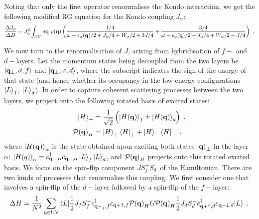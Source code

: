 \documentclass[%
reprint,
superscriptaddress,
groupedaddress,
superscriptaddress,
onecolumn,
10pt
]{revtex4-2}
\begin{document}
Noting that only the first operator renormalises the Kondo interaction, we get the following modified RG equation for the Kondo coupling \(J_\alpha\):
\begin{equation}\begin{aligned}
	\frac{\Delta J_\alpha}{\Delta D} = J_\alpha^2 \int_{UV} d{\bf q} ~\rho({\bf q}) \left(\frac{1/4}{\omega - \epsilon_\alpha({\bf q}) / 2 + J_\alpha / 4 + W_\alpha / 2 + 3J/4} + \frac{3/4}{\omega - \epsilon_\alpha({\bf q}) / 2 + J_\alpha / 4 + W_\alpha / 2 - J/4}\right)~,
\end{aligned}\end{equation}




We now turn to the renormalisation of \(J\), arising from hybridisation of \(f-\) and \(d-\)layers. Let the momentum states being decoupled from the two layers be \(\ket{{\bf q}_\pm,\sigma,f}\) and \(\ket{{\bf q}_\pm,\sigma,d}\), where the subscript indicates the sign of the energy of that state (and hence whether its occupancy in the low-energy configurations \(\ket{L}_f\), \(\ket{L}_d\)). In order to capture coherent scattering processes between the two layers, we project onto the following rotated basis of excited states:
\begin{equation}\begin{aligned}
	\ket{H}_\pm &= \frac{1}{\sqrt{2}}\left(\ket{H({\bf q})}_f \pm \ket{H({\bf q})}_d\right)~,\\
	\mathcal{P({\bf q})}_H &= \ket{H}_+\bra{H}_+ + \ket{H}_-\bra{H}_-~,
\end{aligned}\end{equation}
where \(\ket{H({\bf q})}_\alpha\) is the state obtained upon exciting both states \(\ket{\bf q}_\pm\) in the layer \(\alpha\): \(\ket{H(q)}_\alpha = c^\dagger_{\bf q_+,\alpha}c_{\bf q_-,\alpha}\ket{L}_f\ket{L}_d\), and \(\mathcal{P({\bf q})}_H\) projects onto this rotated excited basis. We focus on the spin-flip component \(J S_f^+ S_d^-\) of the Hamiltonian. There are two kinds of processes that renormalise this coupling. We first consider one that involves a spin-flip of the \(d-\)layer followed by a spin-flip of the \(f-\)layer:
\begin{equation}\begin{aligned}\label{rgEqtn1}
	\Delta H = \frac{1}{N^2}\sum_{{\bf q} \in \text{UV}}\braket{L | \frac{1}{2}J_f S_f^+ c^\dagger_{{\bf q-}_\downarrow,f}c_{{\bf q+}\uparrow,f} \mathcal{P({\bf q})}_H G \mathcal{P({\bf q})}_H\frac{1}{2}J_dS_d^- c^\dagger_{{\bf q+}\uparrow,d}c_{{\bf q-}\downarrow,d} | L }~,
\end{aligned}\end{equation}
\end{document}
